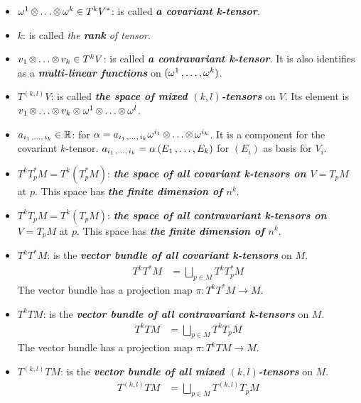 \documentclass[11pt]{article}
\begin{document}
\begin{itemize}
\item $\omega^1 \,{\otimes}\ldots{\otimes}\, \omega^k \in T^{k}V^{*}$: \quad is called \emph{\textbf{a covariant k-tensor}}. 

\item $k$: \quad is called \emph{the \textbf{rank} of tensor}.

\item $v_1 \,{\otimes}\ldots{\otimes}\, v_k \in T^{k}V$: \quad is called \emph{\textbf{a contravariant k-tensor}}. It is also identifies as a \emph{\textbf{multi-linear functions}} on $(\omega^1 \,{,}\ldots{,}\, \omega^k)$.

\item $T^{(k,l)}V$: \quad is called \emph{\textbf{the space of mixed $(k,l)$-tensors}} on $V$. Its element is $v_1 \,{\otimes}\ldots{\otimes}\, v_k \otimes \omega^1 \,{\otimes}\ldots{\otimes}\, \omega^l$.

\item $a_{i_1 \,{,}\ldots{,}\, i_k} \in {\mathbb R}$: \quad for $\alpha = a_{i_1 \,{,}\ldots{,}\, i_k} \omega^{i_1} \,{\otimes}\ldots{\otimes}\, \omega^{i_k}$. It is a component for the covariant $k$-tensor.
$a_{i_1 \,{,}\ldots{,}\, i_k} = \alpha\left(E_1 \,{,}\ldots{,}\, E_k\right)$ for $(E_i)$ as basis for $V_i$.

\item $T^{k}T_{p}^{*}M = T^{k}(T_{p}^{*}M)$: \quad \emph{\textbf{the space of all covariant k-tensors on $V = T_pM$}} at $p$. This space has \emph{\textbf{the finite dimension of $n^k$}}.

\item $T^{k}T_{p}M = T^{k}(T_{p}M)$: \quad \emph{\textbf{the space of all contravariant k-tensors on $V = T_pM$}} at $p$. This space has \emph{\textbf{the finite dimension of $n^k$}}.

\item $T^{k}T^{*}M$: \quad is the \emph{\textbf{vector bundle of all covariant k-tensors}} on $M$.
\begin{align*}
T^{k}T^{*}M&= \bigsqcup_{p\in M}T^{k}T_{p}^{*}M
\end{align*} The vector bundle has a projection map $\pi: T^{k}T^{*}M \rightarrow M$.

\item $T^{k}TM$: \quad is the \emph{\textbf{vector bundle of all contravariant k-tensors}} on $M$.
\begin{align*}
T^{k}TM&= \bigsqcup_{p\in M}T^{k}T_{p}M
\end{align*} The vector bundle has a projection map $\pi: T^{k}TM \rightarrow M$.

\item $T^{(k,l)}TM$: \quad is the \emph{\textbf{vector bundle of all mixed $(k,l)$-tensors}} on $M$.
\begin{align*}
T^{(k,l)}TM&= \bigsqcup_{p\in M}T^{(k,l)}T_{p}M
\end{align*}


\end{itemize}
\end{document}
